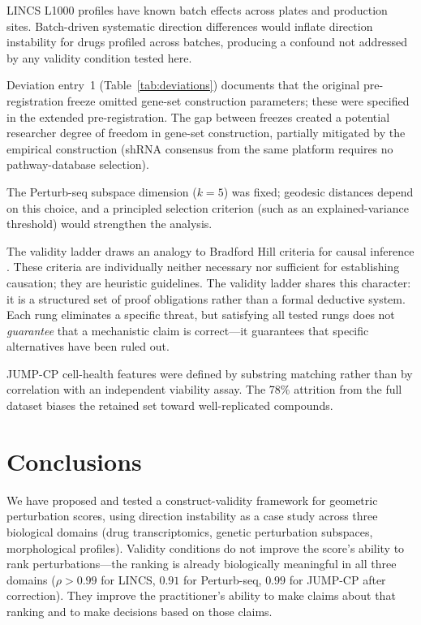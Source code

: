 \documentclass[11pt]{article}
\begin{document}
LINCS L1000 profiles have known batch effects across plates and
production sites. Batch-driven systematic direction differences would
inflate direction instability for drugs profiled across batches,
producing a confound not addressed by any validity condition tested here.

Deviation entry~1 (Table~\ref{tab:deviations}) documents that the
original pre-registration freeze omitted gene-set construction parameters;
these were specified in the extended pre-registration. The gap between
freezes created a potential researcher degree of freedom in gene-set
construction, partially mitigated by the empirical construction (shRNA
consensus from the same platform requires no pathway-database selection).

The Perturb-seq subspace dimension ($k = 5$) was fixed; geodesic
distances depend on this choice, and a principled selection criterion
(such as an explained-variance threshold) would strengthen the analysis.

The validity ladder draws an analogy to Bradford Hill criteria for causal
inference \citep{hill1965environment}. These criteria are individually
neither necessary nor
sufficient for establishing causation; they are heuristic guidelines. The
validity ladder shares this character: it is a structured set of proof
obligations rather than a formal deductive system. Each rung eliminates
a specific threat, but satisfying all tested rungs does not
\emph{guarantee} that a mechanistic claim is correct---it guarantees
that specific alternatives have been ruled out.

JUMP-CP cell-health features were defined by substring matching rather
than by correlation with an independent viability assay. The 78\% attrition
from the full dataset biases the retained set toward well-replicated
compounds.

\section{Conclusions}

We have proposed and tested a construct-validity framework for geometric
perturbation scores, using direction instability as a case study across
three biological domains (drug transcriptomics, genetic perturbation
subspaces, morphological profiles). Validity conditions do not improve the
score's ability to rank perturbations---the ranking is already biologically
meaningful in all three domains ($\rho > 0.99$ for LINCS, $0.91$ for
Perturb-seq, $0.99$ for JUMP-CP after correction). They improve the
practitioner's ability to make claims about that ranking and to make
decisions based on those claims.
\end{document}
